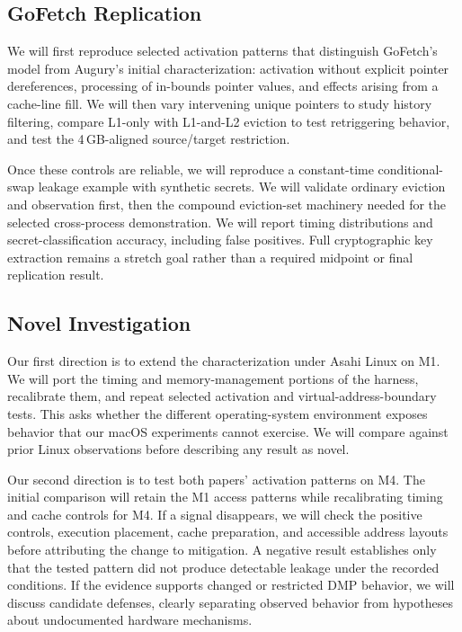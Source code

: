 \subsection{GoFetch Replication}
We will first reproduce selected activation patterns that distinguish GoFetch's model from Augury's initial characterization: activation without explicit pointer dereferences, processing of in-bounds pointer values, and effects arising from a cache-line fill. We will then vary intervening unique pointers to study history filtering, compare L1-only with L1-and-L2 eviction to test retriggering behavior, and test the 4\,GB-aligned source/target restriction.

Once these controls are reliable, we will reproduce a constant-time conditional-swap leakage example with synthetic secrets. We will validate ordinary eviction and observation first, then the compound eviction-set machinery needed for the selected cross-process demonstration. We will report timing distributions and secret-classification accuracy, including false positives. Full cryptographic key extraction remains a stretch goal rather than a required midpoint or final replication result.

\subsection{Novel Investigation}
Our first direction is to extend the characterization under Asahi Linux on M1. We will port the timing and memory-management portions of the harness, recalibrate them, and repeat selected activation and virtual-address-boundary tests. This asks whether the different operating-system environment exposes behavior that our macOS experiments cannot exercise. We will compare against prior Linux observations before describing any result as novel.

Our second direction is to test both papers' activation patterns on M4. The initial comparison will retain the M1 access patterns while recalibrating timing and cache controls for M4. If a signal disappears, we will check the positive controls, execution placement, cache preparation, and accessible address layouts before attributing the change to mitigation. A negative result establishes only that the tested pattern did not produce detectable leakage under the recorded conditions. If the evidence supports changed or restricted DMP behavior, we will discuss candidate defenses, clearly separating observed behavior from hypotheses about undocumented hardware mechanisms.
